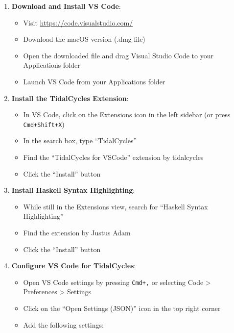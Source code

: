 \documentclass[11pt,a4paper]{article}
\begin{document}
\begin{enumerate}
    \item \textbf{Download and Install VS Code}:
    \begin{itemize}
        \item Visit \href{https://code.visualstudio.com/}{https://code.visualstudio.com/}
        \item Download the macOS version (.dmg file)
        \item Open the downloaded file and drag Visual Studio Code to your Applications folder
        \item Launch VS Code from your Applications folder
    \end{itemize}

    \item \textbf{Install the TidalCycles Extension}:
    \begin{itemize}
        \item In VS Code, click on the Extensions icon in the left sidebar (or press \texttt{Cmd+Shift+X})
        \item In the search box, type ``TidalCycles''
        \item Find the ``TidalCycles for VSCode'' extension by tidalcycles
        \item Click the ``Install'' button
    \end{itemize}

    \item \textbf{Install Haskell Syntax Highlighting}:
    \begin{itemize}
        \item While still in the Extensions view, search for ``Haskell Syntax Highlighting''
        \item Find the extension by Justus Adam
        \item Click the ``Install'' button
    \end{itemize}

    \item \textbf{Configure VS Code for TidalCycles}:
    \begin{itemize}
        \item Open VS Code settings by pressing \texttt{Cmd+,} or selecting Code > Preferences > Settings
        \item Click on the ``Open Settings (JSON)'' icon in the top right corner
        \item Add the following settings:
    \end{itemize}
   

\end{enumerate}
\end{document}
